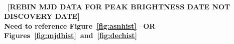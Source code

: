 \documentclass[aps,prb,twocolumn,superscriptaddress]{revtex4-1}
\begin{document}
~\\~{\bf [REBIN MJD DATA FOR PEAK BRIGHTNESS DATE NOT DISCOVERY DATE]}\\
{\bf Need to reference Figure~\ref{fig:asnhist} --OR-- Figures~\ref{fig:mjdhist}~and~\ref{fig:dechist}}
\end{document}
